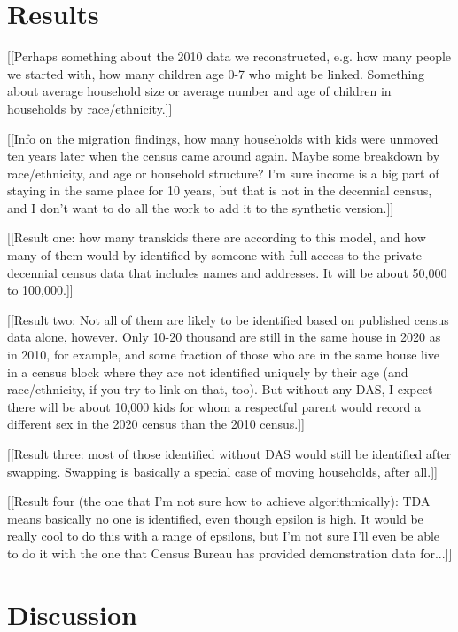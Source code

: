 \documentclass{jpc} %
\theoremstyle{plain}\newtheorem{satz}[thm]{Satz} %
\begin{document}
\section*{Results}

[[Perhaps something about the 2010 data we reconstructed, e.g. how many people we started with, how many children age 0-7 who might be linked. Something about average household size or average number and age of children in households by race/ethnicity.]]

[[Info on the migration findings, how many households with kids were unmoved ten years later when the census came around again.  Maybe some breakdown by race/ethnicity, and age or household structure?  I'm sure income is a big part of staying in the same place for 10 years, but that is not in the decennial census, and I don't want to do all the work to add it to the synthetic version.]]

[[Result one: how many transkids there are according to this model, and how many of them would by identified by someone with full access to the private decennial census data that includes names and addresses.  It will be about 50,000 to 100,000.]]

[[Result two: Not all of them are likely to be identified based on published census data alone, however.  Only 10-20 thousand are still in the same house in 2020 as in 2010, for example, and some fraction of those who are in the same house live in a census block where they are not identified uniquely by their age (and race/ethnicity, if you try to link on that, too).  But without any DAS, I expect there will be about 10,000 kids for whom a respectful parent would record a different sex in the 2020 census than the 2010 census.]]

[[Result three: most of those identified without DAS would still be identified after swapping.  Swapping is basically a special case of moving households, after all.]]

[[Result four (the one that I'm not sure how to achieve algorithmically): TDA means basically no one is identified, even though epsilon is high.  It would be really cool to do this with a range of epsilons, but I'm not sure I'll even be able to do it with the one that Census Bureau has provided demonstration data for...]]

\section{Discussion}
\end{document}
